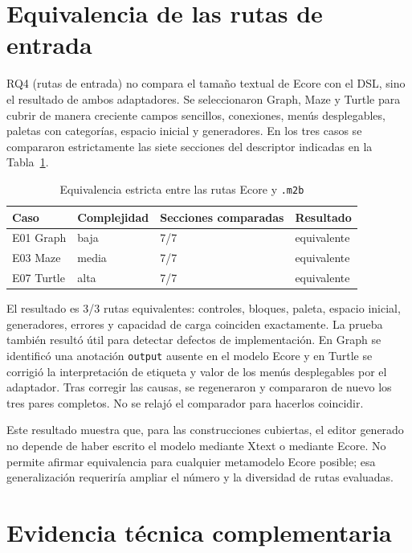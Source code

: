 \section{Equivalencia de las rutas de entrada}
\label{sec:resultados-rutas-entrada}

RQ4 (rutas de entrada) no compara el tamaño textual de Ecore con el DSL, sino el resultado de
ambos adaptadores. Se seleccionaron Graph, Maze y Turtle para cubrir de manera
creciente campos sencillos, conexiones, menús desplegables, paletas con
categorías, espacio inicial y generadores. En los tres casos se compararon
estrictamente las siete secciones del descriptor indicadas en la
Tabla~\ref{tab:equivalencia-rutas}.

\begin{table}[htbp]
  \centering
  \caption{Equivalencia estricta entre las rutas Ecore y \texttt{.m2b}}
  \label{tab:equivalencia-rutas}
  \begin{tabular}{llll}
    \toprule
    Caso & Complejidad & Secciones comparadas & Resultado \\
    \midrule
    E01 Graph  & baja  & 7/7 & equivalente \\
    E03 Maze   & media & 7/7 & equivalente \\
    E07 Turtle & alta  & 7/7 & equivalente \\
    \bottomrule
  \end{tabular}
\end{table}

El resultado es 3/3 rutas equivalentes: controles, bloques, paleta, espacio
inicial, generadores, errores y capacidad de carga coinciden exactamente. La
prueba también resultó útil para detectar defectos de implementación. En Graph
se identificó una anotación \texttt{output} ausente en el modelo Ecore y en
Turtle se corrigió la interpretación de etiqueta y valor de los menús
desplegables por el adaptador. Tras corregir las causas, se regeneraron y
compararon de nuevo los tres pares completos. No se relajó el comparador para
hacerlos coincidir.

Este resultado muestra que, para las construcciones cubiertas, el editor
generado no depende de haber escrito el modelo mediante Xtext o mediante Ecore.
No permite afirmar equivalencia para cualquier metamodelo Ecore posible; esa
generalización requeriría ampliar el número y la diversidad de rutas evaluadas.

\section{Evidencia técnica complementaria}
\label{sec:evidencia-complementaria}

